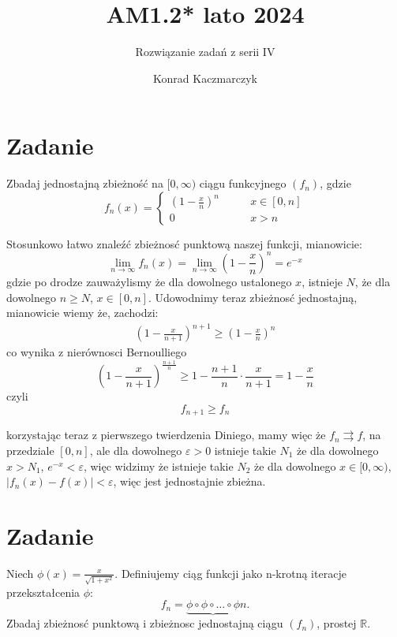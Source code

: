 \documentclass[11pt]{scrartcl}
\author{Konrad Kaczmarczyk}
\begin{document}
  \title{AM1.2* lato 2024}
  \subtitle{Rozwiązanie zadań z serii IV}
  \maketitle
    \section{Zadanie}
        \begin{zadanie}
            Zbadaj jednostajną zbieżność na $[ 0, \infty )$ ciągu funkcyjnego $(f_n)$, gdzie
            \[
                f_n(x) = 
                \begin{cases}
                  \left ( 1 - \frac{x}{n} \right )^n \qquad & x \in [ 0, n ] \\
                  0 \qquad & x > n
                \end{cases}
            \]
        \end{zadanie}
        Stosunkowo łatwo znaleźć zbieżnosć punktową naszej funkcji, mianowicie:
        \[
          \lim_{n \to \infty } f_n(x) = \lim_{n \to \infty } \left ( 1 - \frac{x}{n} \right )^n = e^{-x}  
        \]
        gdzie po drodze zauważylismy że dla dowolnego ustalonego $x$, istnieje $N$, że dla dowolnego $n \geq N$, $x \in [ 0, n]$.
        Udowodnimy teraz zbieżnosć jednostajną, mianowicie wiemy że, zachodzi:
        \begin{gather*}
          \left ( 1 - \frac{x}{n+1} \right )^{n+1} \geq \left ( 1 - \frac{x}{n} \right )^n
        \end{gather*}
        co wynika z nierównosci Bernoulliego
        \[
          \left ( 1 - \frac{x}{n+1} \right )^{\frac{n+1}{n}} \geq 1 - \frac{n+1}{n} \cdot \frac{x}{n+1} = 1 - \frac{x}{n}
        \]
        czyli
        \[
          f_{n+1} \geq f_n
        \]
        
        korzystając teraz z pierwszego twierdzenia Diniego, mamy więc że $f_n \rightrightarrows f$, na przedziale $[0,n]$, ale dla dowolnego $\varepsilon > 0$ istnieje takie $N_1$ że dla dowolnego $x > N_1$, $e^{-x} < \varepsilon$, więc widzimy że istnieje takie $N_2$ że dla dowolnego $x \in [0, \infty )$, $|f_n (x) - f(x)| < \varepsilon$, więc jest jednostajnie zbieżna.

        \newpage

    \section{Zadanie}
      \begin{zadanie}
          Niech $\phi (x) = \frac{x}{\sqrt{1 + x^2} }$. Definiujemy ciąg funkcji jako n-krotną iteracje przekształcenia $\phi$:
          \[
            f_n = \underbrace{\phi \circ \phi \circ \dots \circ \phi}{n}.
          \]
          Zbadaj zbieżnosć punktową i zbieżnosc jednostajną ciągu $(f_n)$, prostej $\mathbb{R} $.
      \end{zadanie}
      
\end{document}
